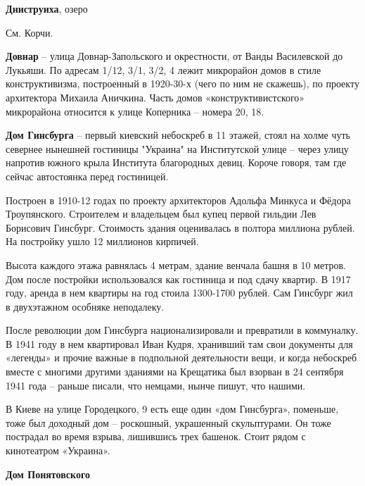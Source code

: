 \medskip

\textbf{Дниструиха}, озеро

См. Корчи.\\

\medskip

\textbf{Довнар} – улица Довнар-Запольского и окрестности, от Ванды Василевской до Лукьяши. По адресам 1/12, 3/1, 3/2, 4 лежит микрорайон домов в стиле конструктивизма, построенный в 1920-30-х (чего по ним не скажешь), по проекту архитектора Михаила Аничкина. Часть домов «конструктивистского» микрорайона относится к улице Коперника – номера 20, 18.\\

\medskip

\textbf{Дом Гинсбурга} – первый киевский небоскреб в 11 этажей, стоял на холме чуть севернее нынешней гостиницы "Украина" на Институтской улице – через улицу напротив южного крыла Института благородных девиц. Короче говоря, там где сейчас автостоянка перед гостиницей. 

Построен в 1910-12 годах по проекту архитекторов Адольфа Минкуса и Фёдора Троупянского. Строителем и владельцем был купец первой гильдии Лев Борисович Гинсбург. Стоимость здания оценивалась в полтора миллиона рублей. На постройку ушло 12 миллионов кирпичей. 

Высота каждого этажа равнялась 4 метрам, здание венчала башня в 10 метров. Дом после постройки использовался как гостиница и под сдачу квартир. В 1917 году, аренда в нем квартиры на год стоила 1300-1700 рублей. Сам Гинсбург жил в двухэтажном особняке неподалеку.

После революции дом Гинсбурга национализировали и превратили в коммуналку. В 1941 году в нем квартировал Иван Кудря, хранивший там свои документы для «легенды» и прочие важные в подпольной деятельности вещи, и когда небоскреб вместе с многими другими зданиями на Крещатика был взорван в 24 сентября 1941 года – раньше писали, что немцами, нынче пишут, что нашими.
 
В Киеве на улице Городецкого, 9 есть еще один «дом Гинсбурга», поменьше, тоже был доходный дом – роскошный, украшенный скульптурами. Он тоже пострадал во время взрыва, лишившись трех башенок. Стоит рядом с кинотеатром «Украина».\\


\medskip


\textbf{Дом Понятовского}


